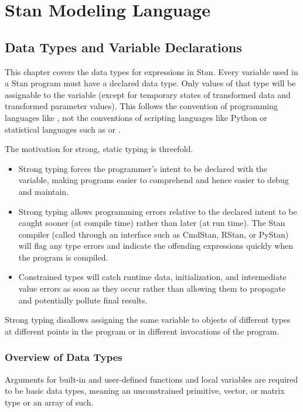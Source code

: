 \part{Stan Modeling Language}



\chapter{Data Types and Variable Declarations}\label{data-types.chapter}

\noindent
This chapter covers the data types for expressions in Stan.  Every
variable used in a Stan program must have a declared data type.  Only
values of that type will be assignable to the variable (except for
temporary states of transformed data and transformed parameter
values).  This follows the convention of programming languages like
\Cpp, not the conventions of scripting languages like Python or
statistical languages such as \R or \BUGS.

The motivation for strong, static typing is threefold.
%
\begin{itemize}
\item Strong typing forces the programmer's intent to be declared with
  the variable, making programs easier to comprehend and hence easier
  to debug and maintain.
\item Strong typing allows programming errors relative to the declared
  intent to be caught sooner (at compile time) rather than later (at
  run time).  The Stan compiler (called through an interface such as
  CmdStan, RStan, or PyStan) will flag any type errors and indicate
  the offending expressions quickly when the program is compiled.
\item Constrained types will catch runtime data, initialization, and
  intermediate value errors as soon as they occur rather than allowing
  them to propagate and potentially pollute final results.
\end{itemize}
%
Strong typing disallows assigning the same variable to objects of
different types at different points in the program or in different
invocations of the program.

\section{Overview of Data Types}

Arguments for built-in and user-defined functions and local variables
are required to be basic data types, meaning an unconstrained
primitive, vector, or matrix type or an array of such.

